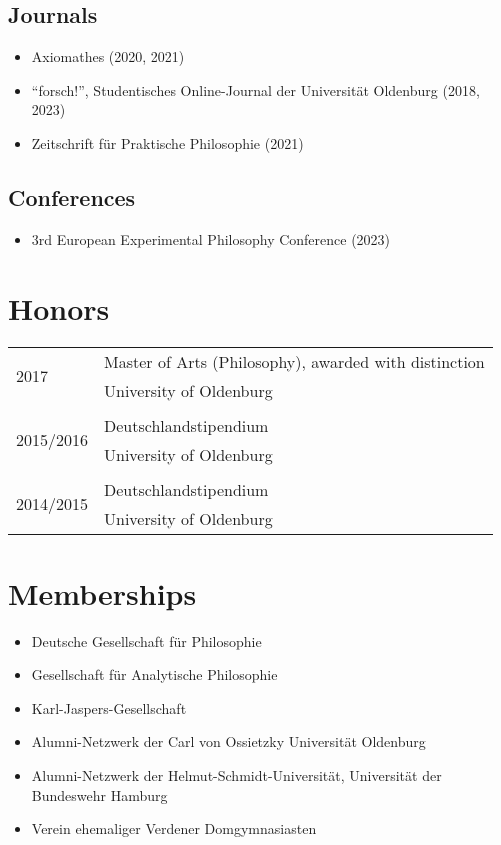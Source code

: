 \documentclass[a4paper,10pt]{article}
\begin{document}
\subsection*{Journals}
\begin{itemize}
   \item Axiomathes (2020, 2021)
   \item \enquote{forsch!}, Studentisches Online-Journal der Universität Oldenburg (2018, 2023)
   \item Zeitschrift für Praktische Philosophie (2021)
\end{itemize}

\subsection*{Conferences}
\begin{itemize}
   \item 3rd European Experimental Philosophy Conference (2023)
\end{itemize}


\clearpage
\section{Honors}
\begin{longtable}{p{}p{11cm}}
\multirow{2}{2,25cm}{\footnotesize{2017}} & Master of Arts (Philosophy), awarded with distinction\\
& \footnotesize{University of Oldenburg}\\
\\
\multirow{2}{2,25cm}{\footnotesize{2015/2016}} & Deutschlandstipendium\\
& \footnotesize{University of Oldenburg}\\
\\
\multirow{2}{2,25cm}{\footnotesize{2014/2015}} & Deutschlandstipendium\\
& \footnotesize{University of Oldenburg}\\
\end{longtable}


\clearpage
\section{Memberships}
\begin{itemize}
   \item Deutsche Gesellschaft für Philosophie
   \item Gesellschaft für Analytische Philosophie
   \item Karl-Jaspers-Gesellschaft
   \item Alumni-Netzwerk der Carl von Ossietzky Universität Oldenburg
   \item Alumni-Netzwerk der Helmut-Schmidt-Universität, Universität der Bundeswehr Hamburg
   \item Verein ehemaliger Verdener Domgymnasiasten
\end{itemize}
\end{document}
